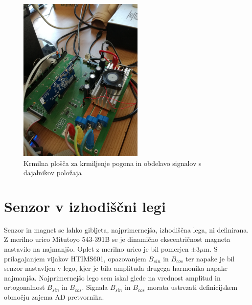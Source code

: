 \begin{figure}[!ht]
	\centering
	\includegraphics[width=0.55\textwidth]{./Slike/krmilnaplosca.jpg}
	\caption{Krmilna plošča za krmiljenje pogona in obdelavo signalov s dajalnikov položaja}
	\label{krmilnaplosca.jpg}
\end{figure}
\newpage
\section{Senzor v izhodiščni legi}
Senzor in magnet se lahko gibljeta, najprimernejša, izhodiščna lega, ni definirana. Z merilno urico Mitutoyo 543-391B se je dinamično ekscentričnost magneta nastavilo na najmanjšo. Oplet z merilno urico je bil pomerjen $\pm 3 \mu\mathrm{m}$.
S prilagajanjem vijakov HTIMS601, opazovanjem $B_{sin}$ in $B_{cos}$ ter napake je bil senzor nastavljen v lego, kjer je bila amplituda drugega harmonika napake najmanjša. Najprimernejšo lego sem iskal glede na vrednost amplitud in ortogonalnost  $B_{sin}$ in $B_{cos}$. Signala $B_{sin}$ in $B_{cos}$ morata ustrezati definicijskem območju zajema AD pretvornika.

